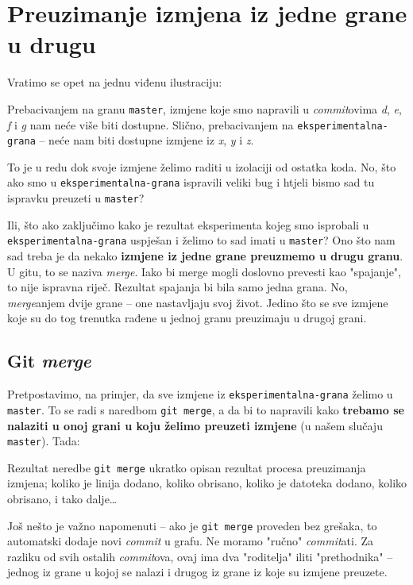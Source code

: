 \chapter*{Preuzimanje izmjena iz jedne grane u drugu}

Vratimo se opet na jednu viđenu ilustraciju:



Prebacivanjem na granu \verb+master+, izmjene koje smo napravili u \emph{commit}ovima \emph d, \emph e, \emph f i \emph g nam neće više biti dostupne.
Slično, prebacivanjem na \verb+eksperimentalna-grana+ -- neće nam biti dostupne izmjene iz \emph x, \emph y i \emph z.

To je u redu dok svoje izmjene želimo raditi u izolaciji od ostatka koda. 
No, što ako smo u \verb+eksperimentalna-grana+ ispravili veliki bug i htjeli bismo sad tu ispravku preuzeti u \verb+master+?

Ili, što ako zaključimo kako je rezultat eksperimenta kojeg smo isprobali u \\
\verb+eksperimentalna-grana+ uspješan i želimo to sad imati u \verb+master+?
Ono što nam sad treba je da nekako \textbf{izmjene iz jedne grane preuzmemo u drugu granu}.
U gitu, to se naziva \emph{merge}.
Iako bi merge mogli doslovno prevesti kao "spajanje", to nije ispravna riječ. 
Rezultat spajanja bi bila samo jedna grana. 
No, \emph{merge}anjem dvije grane -- one nastavljaju svoj život. 
Jedino što se sve izmjene koje su do tog trenutka rađene u jednoj granu preuzimaju u drugoj grani.

\section*{Git \emph{merge}}

Pretpostavimo, na primjer, da sve izmjene iz \verb+eksperimentalna-grana+ želimo u \verb+master+. 
To se radi s naredbom \verb+git merge+, a da bi to napravili kako \textbf{trebamo se nalaziti u onoj grani u koju želimo preuzeti izmjene} (u našem slučaju \verb+master+).
Tada:



Rezultat neredbe \verb+git merge+ ukratko opisan rezultat procesa preuzimanja izmjena; koliko je linija dodano, koliko obrisano, koliko je datoteka dodano, koliko obrisano, i tako dalje\dots

Još nešto je važno napomenuti -- ako je \verb+git merge+ proveden bez grešaka, to automatski dodaje novi \emph{commit} u grafu. 
Ne moramo "ručno" \emph{commit}ati.
Za razliku od svih ostalih \emph{commit}ova, ovaj ima dva "roditelja" iliti "prethodnika" -- jednog iz grane u kojoj se nalazi i drugog iz grane iz koje su izmjene preuzete.

